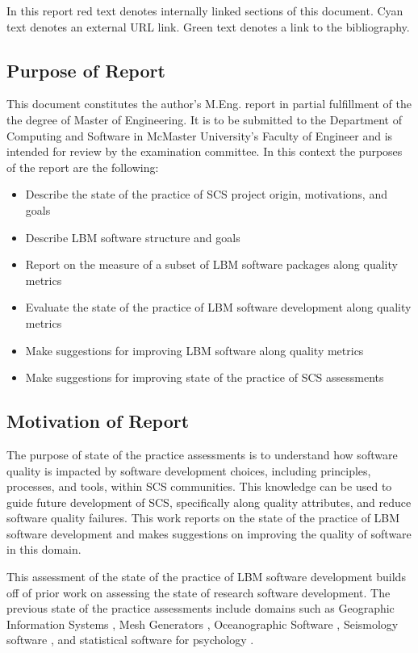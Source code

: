 \documentclass[12pt, notitlepage]{article}
\begin{document}
In this report red text denotes internally linked sections of this document. Cyan text denotes an external URL link. Green text denotes a link to the bibliography.

\subsection{Purpose of Report}

This document constitutes the author's M.Eng. report in partial fulfillment of the the degree of Master of Engineering. It is to be submitted to the Department of Computing and Software in McMaster University's Faculty of Engineer and is intended for review by the examination committee. In this context the purposes of the report are the following:

\begin{itemize}
	\item Describe the state of the practice of SCS project origin, motivations, and goals
	\item Describe LBM software structure and goals
	\item Report on the measure of a subset of LBM software packages along quality metrics
	\item Evaluate the state of the practice of LBM software development along quality metrics
	\item Make suggestions for improving LBM software along quality metrics
	\item Make suggestions for improving state of the practice of SCS assessments
\end{itemize}

\subsection{Motivation of Report}

The purpose of state of the practice assessments is to understand how software quality is impacted by software development choices, including principles, processes, and tools, within SCS communities. This knowledge can be used to guide future development of SCS, specifically along quality attributes, and reduce software quality failures. This work reports on the state of the practice of LBM software development and makes suggestions on improving the quality of software in this domain.

This assessment of the state of the practice of LBM software development builds off of prior work on assessing the state of research software development. The previous state of the practice assessments include domains such as Geographic Information Systems \citep{SmithEtAl2018_arXivGIS}, Mesh Generators \citep{SmithEtAl2016}, Oceanographic Software \citep{smith2015state}, Seismology software \citep{SmithEtAl2018}, and statistical software for psychology \citep{SmithEtAl2018_StatSoft}. 
\end{document}
